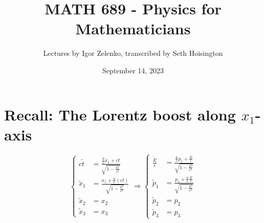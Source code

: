 \documentclass{article}
\title{MATH 689 - Physics for Mathematicians}
\author{Lectures by Igor Zelenko, transcribed by Seth Hoisington}
\date{September 14, 2023}
\begin{document}
\maketitle
\section{Recall: The Lorentz boost along $x_1$-axis}
\[\left\{\begin{aligned}
    c\tilde{t}&=\frac{\frac{y}{c}x_1 + ct}{\sqrt{1-\frac{u^2}{c^2}}}\\
    \tilde{x}_1&=\frac{x_1+\frac{u}{c} (ct)}{\sqrt{1-\frac{u^2}{c^2}}}\\
    \tilde{x}_2&= x_2\\
    \tilde{x}_3&= x_3
\end{aligned}\right.\Rightarrow \left\{\begin{aligned}
    \frac{\tilde E}{c}&=\frac{\frac{u}{c}p_1 + \frac{E}{c}}{\sqrt{1-\frac{u^2}{c^2}}}\\
    \tilde{p}_1&=\frac{p_1+\frac{u}{c} \frac{E}{c}}{\sqrt{1-\frac{u^2}{c^2}}}\\
    \tilde{p}_2&= p_2\\
    \tilde{p}_3&= p_3
\end{aligned}\right.\]
\end{document}
